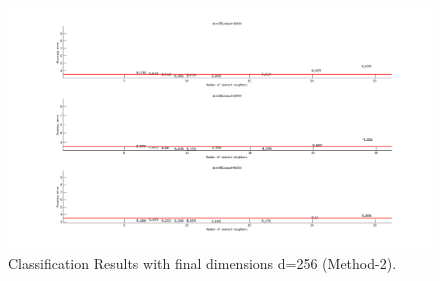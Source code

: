 \newpage
\begin{figure}[t!]
\centering
\includegraphics[width=\textwidth]{figs/10.png}
\newline
\caption{ \textlatin{Classification Results with final dimensions d=256 (Method-2)}.} 
\end{figure}
\par
